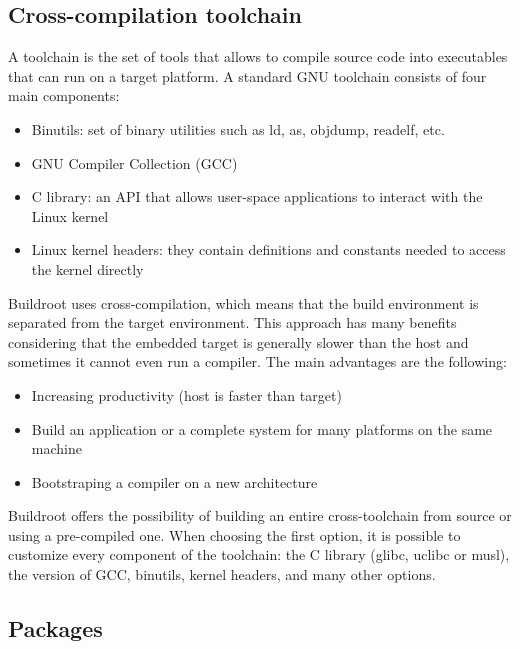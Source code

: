 \documentclass[12pt,a4paper,oneside]{article}
\begin{document}
\subsection{Cross-compilation toolchain}

A toolchain is the set of tools that allows to compile source code into executables
that can run on a target platform. A standard GNU toolchain consists of four
main components:
\begin{itemize}
  \item Binutils: set of binary utilities such as ld, as, objdump, readelf, etc.
  \item GNU Compiler Collection (GCC)
  \item C library: an API that allows user-space applications to
  interact with the Linux kernel
  \item Linux kernel headers: they contain definitions and constants needed to
  access the kernel directly
\end{itemize}
Buildroot uses cross-compilation, which means that the build environment is
separated from the target environment. This approach has many benefits considering
that the embedded target is generally slower than the host and sometimes it cannot
even run a compiler. The main advantages are the following:
\begin{itemize}
  \item Increasing productivity (host is faster than target)
  \item Build an application or a complete system for many platforms on the same
  machine
  \item Bootstraping a compiler on a new architecture
\end{itemize}
Buildroot offers the possibility of building an entire cross-toolchain from
source or using a pre-compiled one. When choosing the first option, it is possible
to customize every component of the toolchain: the C library (glibc, uclibc or
musl), the version of GCC, binutils, kernel headers, and many other options.

\subsection{Packages}
\end{document}
